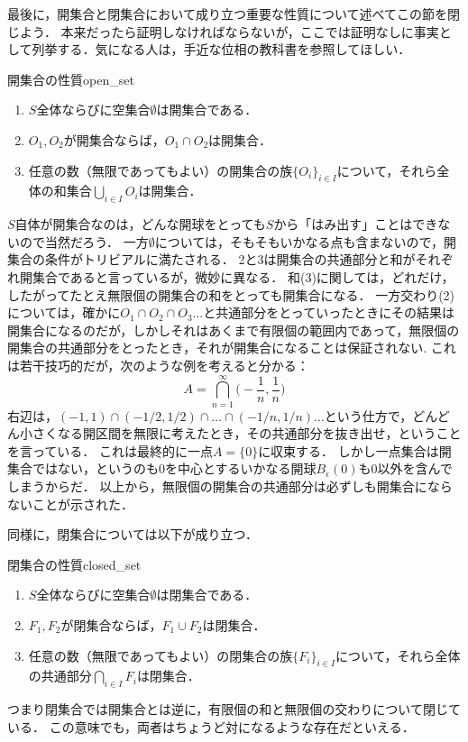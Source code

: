 \documentclass[11pt,a4paper, dvipdfmx]{jsarticle}
\begin{document}
最後に，開集合と閉集合において成り立つ重要な性質について述べてこの節を閉じよう．
本来だったら証明しなければならないが，ここでは証明なしに事実として列挙する．気になる人は，手近な位相の教科書を参照してほしい．

\begin{prop}{開集合の性質}{open_set}
\begin{enumerate}
 \item $S$全体ならびに空集合$\emptyset$は開集合である．
 \item $O_1, O_2$が開集合ならば，$O_1 \cap O_2$は開集合．
 \item 任意の数（無限であってもよい）の開集合の族$\{ O_i \}_{i \in I}$について，それら全体の和集合$\bigcup_{i \in I} O_i$は開集合．
\end{enumerate}
\end{prop}

$S$自体が開集合なのは，どんな開球をとっても$S$から「はみ出す」ことはできないので当然だろう．
一方$\emptyset$については，そもそもいかなる点も含まないので，開集合の条件がトリビアルに満たされる．
2と3は開集合の共通部分と和がそれぞれ開集合であると言っているが，微妙に異なる．
和(3)に関しては，どれだけ，したがってたとえ無限個の開集合の和をとっても開集合になる．
一方交わり(2)については，確かに$O_1 \cap O_2 \cap O_3 \dots$と共通部分をとっていったときにその結果は開集合になるのだが，しかしそれはあくまで有限個の範囲内であって，無限個の開集合の共通部分をとったとき，それが開集合になることは保証されない.
これは若干技巧的だが，次のような例を考えると分かる：
\[ A = \bigcap_{n=1}^{\infty} \bigg( -\frac{1}{n}, \frac{1}{n} \bigg) \]
右辺は，$(-1, 1) \cap (-1/2, 1/2) \cap \dots \cap (-1/n,1/n) \dots$という仕方で，どんどん小さくなる開区間を無限に考えたとき，その共通部分を抜き出せ，ということを言っている．
これは最終的に一点$A=\{0\}$に収束する．
しかし一点集合は開集合ではない，というのも0を中心とするいかなる開球$B_\epsilon(0)$も0以外を含んでしまうからだ．
以上から，無限個の開集合の共通部分は必ずしも開集合にならないことが示された．

同様に，閉集合については以下が成り立つ．

\begin{prop}{閉集合の性質}{closed_set}
  \begin{enumerate}
   \item $S$全体ならびに空集合$\emptyset$は閉集合である．
   \item $F_1, F_2$が閉集合ならば，$F_1 \cup F_2$は閉集合．
   \item 任意の数（無限であってもよい）の閉集合の族$\{ F_i \}_{i \in I}$について，それら全体の共通部分$\bigcap_{i \in I} F_i$は閉集合．
  \end{enumerate}
  \end{prop}
  つまり閉集合では開集合とは逆に，有限個の和と無限個の交わりについて閉じている．
  この意味でも，両者はちょうど対になるような存在だといえる．
\end{document}
